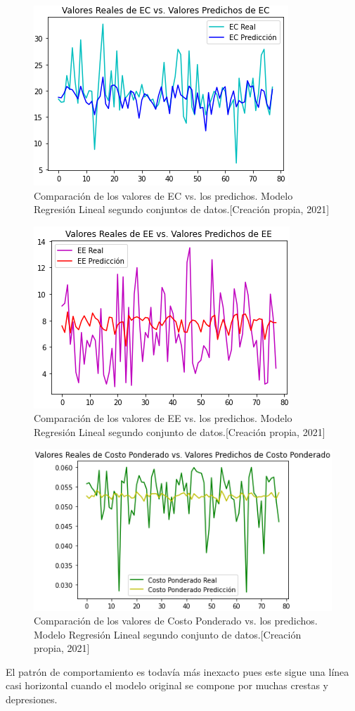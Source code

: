 \documentclass{article}
\begin{document}
\begin{figure}[!h]
    \centering
    \includegraphics[scale=.7]{F4/F4-im19.PNG}
    \caption{Comparación de los valores de EC vs. los predichos. Modelo Regresión Lineal segundo conjuntos de datos.[Creación propia, 2021]}
    \label{fig:EC2.2}
\end{figure}

\begin{figure}[!h]
    \centering
    \includegraphics[scale=.7]{F4/F4-im20.PNG}
    \caption{Comparación de los valores de EE vs. los predichos. Modelo Regresión Lineal segundo conjunto de datos.[Creación propia, 2021]}
    \label{fig:EE2.2}
\end{figure}

\begin{figure}[!h]
    \centering
    \includegraphics[scale=.7]{F4/F4-im21.PNG}
    \caption{Comparación de los valores de Costo Ponderado vs. los predichos. Modelo Regresión Lineal segundo conjunto de datos.[Creación propia, 2021]}
    \label{fig:CostoPonderado2.2}
\end{figure}
\pagebreak
El patrón de comportamiento es todavía más inexacto pues este sigue una línea casi horizontal cuando el modelo original se compone por muchas crestas y depresiones.
\end{document}
